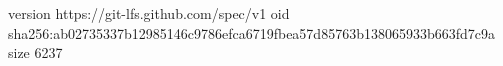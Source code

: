 version https://git-lfs.github.com/spec/v1
oid sha256:ab02735337b12985146c9786efca6719fbea57d85763b138065933b663fd7c9a
size 6237
